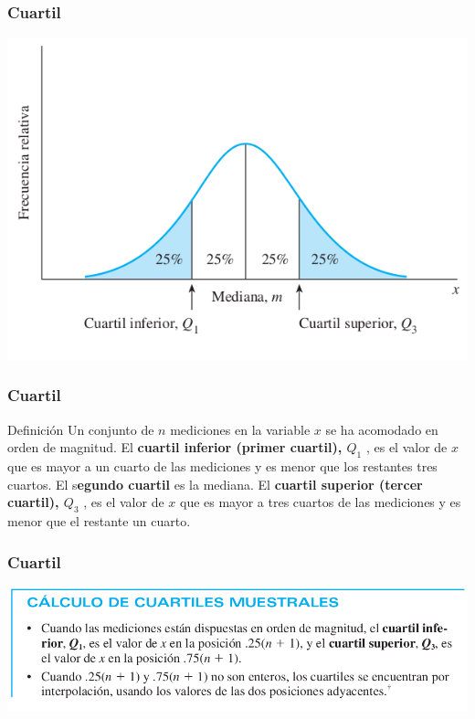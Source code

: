 \documentclass[spanish]{beamer}
\begin{document}
\begin{frame}
\frametitle{Cuartil}

\begin{center}
\includegraphics[scale=0.4]{im26}
\end{center}

\end{frame}
\begin{frame}
\frametitle{Cuartil}

\begin{block}{Definición}
Un conjunto de $n$ mediciones en la variable $x$ se ha acomodado en orden
de magnitud. El \textbf{cuartil inferior (primer cuartil), $Q_{1}$ }, es el valor de $x$ que es mayor a un cuarto de las mediciones y es menor que los restantes tres cuartos. El s\textbf{egundo cuartil} es la mediana. El \textbf{cuartil superior (tercer cuartil), $Q_{3}$ }, es el valor de $x$ que es mayor a tres cuartos de las mediciones y es menor que el restante un cuarto.
\end{block}

\end{frame}
\begin{frame}
\frametitle{Cuartil}

\begin{center}
\includegraphics[width=\textwidth]{im27}
\end{center}


\end{frame}
\end{document}
